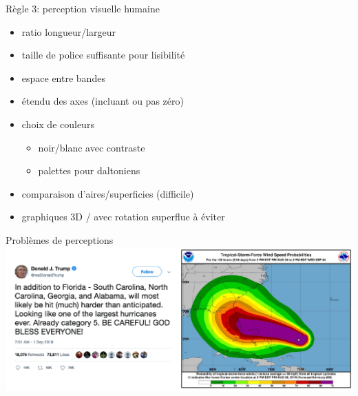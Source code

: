 \documentclass[
  ignorenonframetext,
]{beamer}
\providecommand{\tightlist}{%
  \setlength{\itemsep}{0pt}\setlength{\parskip}{0pt}}\usepackage{longtable,booktabs,array}
\begin{document}
\begin{frame}{Règle 3: perception visuelle humaine}
\protect\hypertarget{ruxe8gle-3-perception-visuelle-humaine}{}
\begin{itemize}
\tightlist
\item
  ratio longueur/largeur
\item
  taille de police suffisante pour lisibilité
\item
  espace entre bandes
\item
  étendu des axes (incluant ou pas zéro)
\item
  choix de couleurs

  \begin{itemize}
  \tightlist
  \item
    noir/blanc avec contraste
  \item
    palettes pour daltoniens
  \end{itemize}
\item
  comparaison d'aires/superficies (difficile)
\item
  graphiques 3D / avec rotation superflue à éviter
\end{itemize}
\end{frame}

\begin{frame}{Problèmes de perceptions}
\protect\hypertarget{probluxe8mes-de-perceptions}{}
\includegraphics{MATH60602-diapos1_files/figure-beamer/unnamed-chunk-9-1.pdf}
\end{frame}
\end{document}
